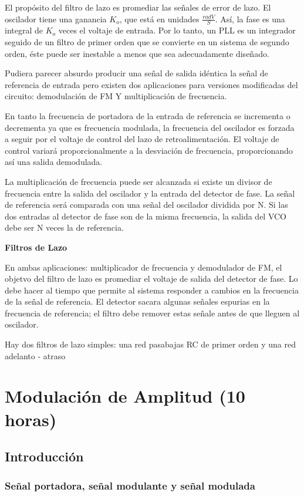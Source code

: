 \documentclass[12pt,letterpaper,titlepage,twoside]{book}
\begin{document}
El propósito del filtro de lazo es promediar las señales de error de lazo. El oscilador tiene una ganancia $K_o$, que está en unidades $\frac{rad V}{S}$. Así, la fase es una integral de $K_o$ veces el voltaje de entrada. Por lo tanto, un PLL es un integrador seguido de un filtro de primer orden que se convierte en un sistema de segundo orden, éste puede ser inestable a menos que sea adecuadamente diseñado.

Pudiera parecer absurdo producir una señal de salida idéntica la señal de referencia de entrada pero existen dos aplicaciones para versiones modificadas del circuito: demodulación de FM Y multiplicación de frecuencia.

En tanto la frecuencia de portadora de la entrada de referencia se incrementa o decrementa ya que es frecuencia modulada, la frecuencia del oscilador es forzada a seguir por el voltaje de control del lazo de retroalimentación. El voltaje de control variará proporcionalmente a la desviación de frecuencia, proporcionando así una salida demodulada.

La multiplicación de frecuencia puede ser alcanzada si existe un divisor de frecuencia entre la salida del oscilador y la entrada del detector de fase. La señal de referencia será comparada con una señal del oscilador dividida por N. Si las dos entradas al detector de fase son de la misma frecuencia, la salida del VCO debe ser N veces la de referencia.

\textbf{Filtros de Lazo}

En ambas aplicaciones: multiplicador de frecuencia y demodulador de FM, el objetvo del filtro de lazo es promediar el voltaje de salida del detector de fase. Lo debe hacer al tiempo que permite al sistema responder a cambios en la frecuencia de la señal de referencia. El detector sacara algunas señales espurias en la frecuencia de referencia; el filtro debe remover estas señale antes de que lleguen al oscilador.

Hay dos filtros de lazo simples: una red pasabajas RC de primer orden y una red adelanto - atraso 

 
\chapter{Modulación de Amplitud (10 horas)}
\section{Introducción}
\subsection{Señal portadora, señal modulante y señal modulada}
\end{document}
